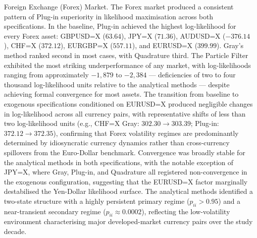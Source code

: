 \documentclass[12pt, a4paper]{article}
\begin{document}
Foreign Exchange (Forex) Market.
The Forex market produced a consistent pattern of Plug-in superiority in likelihood maximisation across both specifications. In the baseline, Plug-in achieved the highest log-likelihood for every Forex asset: GBPUSD=X ($63.64$), JPY=X ($71.36$), AUDUSD=X ($-376.14$), CHF=X ($372.12$), EURGBP=X ($557.11$), and EURUSD=X ($399.99$). Gray's method ranked second in most cases, with Quadrature third. The Particle Filter exhibited the most striking underperformance of any market, with log-likelihoods ranging from approximately $-1{,}879$ to $-2{,}384$ — deficiencies of two to four thousand log-likelihood units relative to the analytical methods — despite achieving formal convergence for most assets. The transition from baseline to exogenous specifications conditioned on EURUSD=X produced negligible changes in log-likelihood across all currency pairs, with representative shifts of less than two log-likelihood units (e.g., CHF=X Gray: $302.30 \to 303.39$; Plug-in: $372.12 \to 372.35$), confirming that Forex volatility regimes are predominantly determined by idiosyncratic currency dynamics rather than cross-currency spillovers from the Euro-Dollar benchmark. Convergence was broadly stable for the analytical methods in both specifications, with the notable exception of JPY=X, where Gray, Plug-in, and Quadrature all registered non-convergence in the exogenous configuration, suggesting that the EURUSD=X factor marginally destabilised the Yen-Dollar likelihood surface. The analytical methods identified a two-state structure with a highly persistent primary regime ($p_{ii} > 0.95$) and a near-transient secondary regime ($p_{ii} \approx 0.0002$), reflecting the low-volatility environment characterising major developed-market currency pairs over the study decade.
\end{document}
